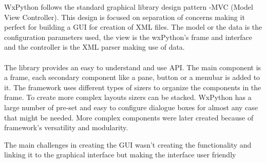 WxPython follows the standard graphical library design pattern -MVC (Model View Controller).
 This design is focused on separation of concerns making it perfect for building a GUI for creation of XML files. The model or the 
data is the configuration parameters used, the view is the wxPython's frame and interface and the controller is the XML parser making use of data.
\paragraph{}
The library provides an easy to understand and use API. The main component is a frame, each secondary component like a pane, button or a menubar
is added to it. The framework uses different types of sizers to organize the components in the frame. To create more complex layouts
sizers can be stacked. WxPython has a large number of pre-set and easy to configure dialogue boxes for almost any case that might be needed.
More complex components were later created because of framework's versatility and modularity.





The main challenges in creating the GUI wasn't creating the functionality and linking it to the graphical interface but making
the interface user friendly